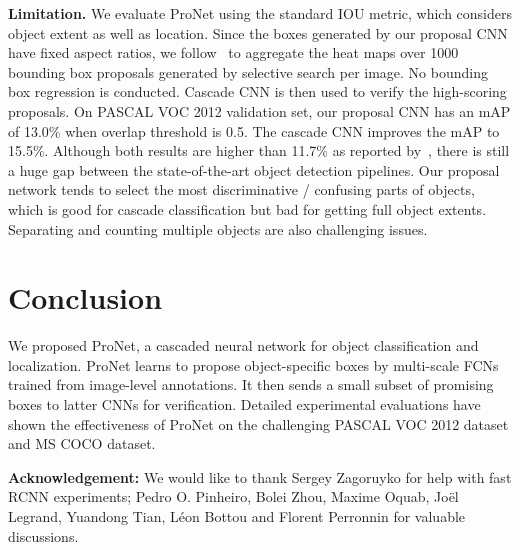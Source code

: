 \documentclass[10pt,twocolumn,letterpaper]{article}
\begin{document}
\textbf{Limitation.} We evaluate ProNet using the standard IOU metric, which considers object extent as well as location. Since the boxes generated by our proposal CNN have fixed aspect ratios, we follow~\cite{Oquab_2015_CVPR} to aggregate the heat maps over 1000 bounding box proposals generated by selective search per image. No bounding box regression is conducted. Cascade CNN is then used to verify the high-scoring proposals. On PASCAL VOC 2012 validation set, our proposal CNN has an mAP of 13.0\% when overlap threshold is 0.5. The cascade CNN improves the mAP to 15.5\%. Although both results are higher than 11.7\% as reported by~\cite{Oquab_2015_CVPR}, there is still a huge gap between the state-of-the-art object detection pipelines. Our proposal network tends to select the most discriminative / confusing parts of objects, which is good for cascade classification but bad for getting full object extents. Separating and counting multiple objects are also challenging issues. 




\section{Conclusion}
We proposed ProNet, a cascaded neural network for object classification and localization. ProNet learns to propose object-specific boxes by multi-scale FCNs trained from image-level annotations. It then sends a small subset of promising boxes to latter CNNs for verification. Detailed experimental evaluations have shown the effectiveness of ProNet on the challenging PASCAL VOC 2012 dataset and MS COCO dataset.

{\small
\quad\newline
\textbf{Acknowledgement:}
We would like to thank Sergey Zagoruyko for help with fast RCNN experiments;
Pedro O. Pinheiro, Bolei Zhou, Maxime Oquab, Jo{\"{e}}l Legrand, Yuandong Tian, L{\'{e}}on Bottou and Florent Perronnin for valuable discussions.
}


{\small


}
\end{document}
